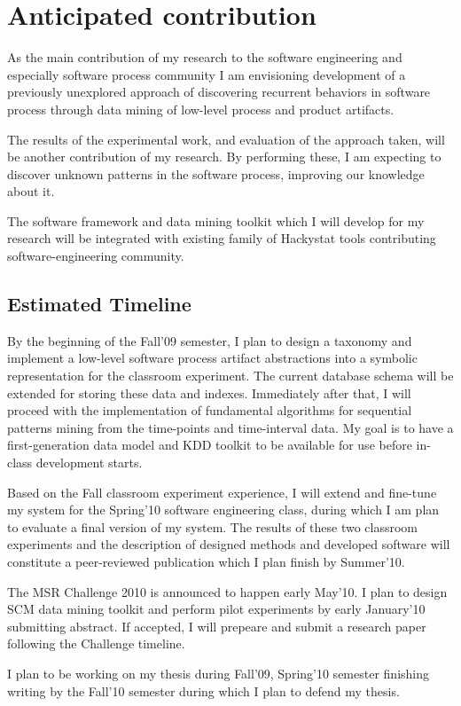 \chapter{Anticipated contribution} \label{contribution}
As the main contribution of my research to the software engineering and especially software process community I am envisioning development of a previously unexplored approach of discovering recurrent behaviors in software process through data mining of low-level process and product artifacts.

The results of the experimental work, and evaluation of the approach taken, will be another contribution of my research. By performing these, I am expecting to discover unknown patterns in the software process, improving our knowledge about it.

The software framework and data mining toolkit which I will develop for my research will be integrated with existing family of Hackystat tools contributing software-engineering community.

\section{Estimated Timeline}
By the beginning of the Fall'09 semester, I plan to design a taxonomy and implement a low-level software process artifact abstractions into a symbolic representation for the classroom experiment. The current database schema will be extended for storing these data and indexes. Immediately after that, I will proceed with the implementation of fundamental algorithms for sequential patterns mining from the time-points and time-interval data. My goal is to have a first-generation data model and KDD toolkit to be available for use before in-class development starts. 

Based on the Fall classroom experiment experience, I will extend and fine-tune my system for the Spring'10 software engineering class, during which I am plan to evaluate a final version of my system. The results of these two classroom experiments and the description of designed methods and developed software will constitute a peer-reviewed publication which I plan finish by Summer'10.

The MSR Challenge 2010 is announced to happen early May'10. I plan to design SCM data mining toolkit and perform pilot experiments by early January'10 submitting abstract. If accepted, I will prepeare and submit a research paper following the Challenge timeline.

I plan to be working on my thesis during Fall'09, Spring'10 semester finishing writing by the Fall'10 semester during which I plan to defend my thesis.
